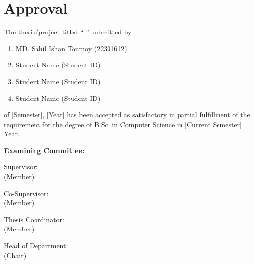 \section*{Approval}

The thesis/project titled “ ” submitted by 
\begin{enumerate}
  \item MD. Sahil Ishan Tonmoy (22301612)
  \item Student Name (Student ID)
  \item Student Name (Student ID) 
  \item Student Name (Student ID)
\end{enumerate}

of [Semester], [Year] has been accepted as satisfactory in partial fulfillment of the requirement for the degree of B.Sc. in Computer Science in [Current Semester] Year. 

\vspace{0.5cm}
\textbf{Examining Committee:}

\vspace{1cm}

Supervisor:\\
(Member)
\begin{center}
    \hspace{7cm}  \hspace{1cm} 
\end{center}

Co-Supervisor:\\
(Member)
\begin{center}
    \hspace{7cm}  \hspace{1cm} 
\end{center}


Thesis Coordinator:\\
(Member)
\begin{center}
    \hspace{7cm}  \hspace{1cm} 
\end{center}

Head of Department:\\
(Chair)
\begin{center}
    \hspace{7cm}  \hspace{1cm} 
\end{center}

\pagebreak